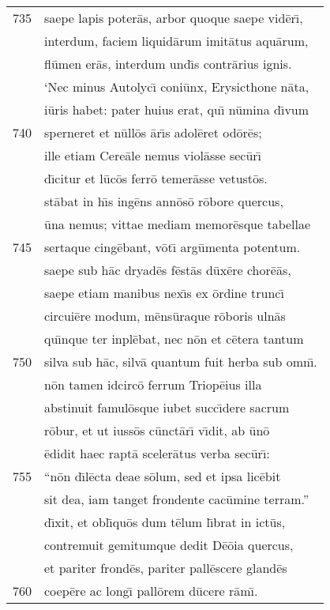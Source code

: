 \documentclass[paper=6in:9in,pagesize=pdftex,
               headinclude=on,footinclude=on,12pt]{scrbook}
\begin{document}
\begin{longtable}[p]{ r l }
735 & saepe lapis poter\=as, arbor quoque saepe vid\=er\={\i},\\ 
 & interdum, faciem liquid\=arum imit\=atus aqu\=arum,\\ 
 & fl\=umen er\=as, interdum und\={\i}s contr\=arius ignis.\\ 
 & \indent `Nec minus Autolyc\={\i} coni\=unx, Erysicthone n\=ata,\\ 
 & i\=uris habet: pater huius erat, qu\={\i} n\=umina d\={\i}vum\\ 
740 & sperneret et n\=ull\=os \=ar\={\i}s adol\=eret od\=or\=es;\\ 
 & ille etiam Cere\=ale nemus viol\=asse sec\=ur\={\i}\\ 
 & d\={\i}citur et l\=uc\=os ferr\=o temer\=asse vetust\=os.\\ 
 & st\=abat in h\={\i}s ing\=ens ann\=os\=o r\=obore quercus,\\ 
 & \=una nemus; vittae mediam memor\=esque tabellae\\ 
745 & sertaque cing\=ebant, v\=ot\={\i} arg\=umenta potentum.\\ 
 & saepe sub h\=ac dryad\=es f\=est\=as d\=ux\=ere chor\=e\=as,\\ 
 & saepe etiam manibus nex\={\i}s ex \=ordine trunc\={\i}\\ 
 & circui\=ere modum, m\=ens\=uraque r\=oboris uln\=as\\ 
 & qu\={\i}nque ter inpl\=ebat, nec n\=on et c\=etera tantum\\ 
750 & silva sub h\=ac, silv\=a quantum fuit herba sub omn\={\i}.\\ 
 & n\=on tamen idcirc\=o ferrum Triop\=eius illa\\ 
 & abstinuit famul\=osque iubet succ\={\i}dere sacrum\\ 
 & r\=obur, et ut iuss\=os c\=unct\=ar\={\i} v\={\i}dit, ab \=un\=o\\ 
 & \=edidit haec rapt\=a sceler\=atus verba sec\=ur\={\i}:\\ 
755 & ``n\=on d\={\i}l\=ecta deae s\=olum, sed et ipsa lic\=ebit\\ 
 & sit dea, iam tanget frondente cac\=umine terram.''\\ 
 & d\={\i}xit, et obl\={\i}qu\=os dum t\=elum l\={\i}brat in ict\=us,\\ 
 & contremuit gemitumque dedit D\=e\=oia quercus,\\ 
 & et pariter frond\=es, pariter pall\=escere gland\=es\\ 
760 & coep\=ere ac long\={\i} pall\=orem d\=ucere r\=am\={\i}.\\ 

\end{longtable}
\end{document}
